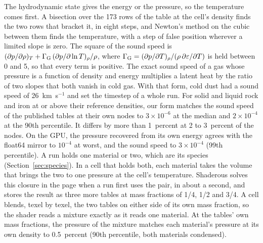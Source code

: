 \documentclass[twocolumn]{aastex701}
\begin{document}
The hydrodynamic state gives the energy or the pressure, so the temperature comes first. A bisection over the 173 rows of the table at the cell's density finds the two rows that bracket it, in eight steps, and Newton's method on the cubic between them finds the temperature, with a step of false position wherever a limited slope is zero. The square of the sound speed is $(\partial p/\partial\rho)_T + \Gamma_{\rm G}\,(\partial p/\partial\ln T)_\rho/\rho$, where $\Gamma_{\rm G} = (\partial p/\partial T)_\rho/(\rho\,\partial\varepsilon/\partial T)$ is held between 0 and 5, so that every term is positive. The exact sound speed of a gas whose pressure is a function of density and energy multiplies a latent heat by the ratio of two slopes that both vanish in cold gas. With that form, cold dust had a sound speed of 26~km~s$^{-1}$ and set the timestep of a whole run. For solid and liquid rock and iron at or above their reference densities, our form matches the sound speed of the published tables \citep{StewartFe85Si15_2020, StewartPyrolite2022} at their own nodes to $3\times10^{-6}$ at the median and $2\times10^{-4}$ at the 90th percentile. It differs by more than 1~percent at 2 to 3~percent of the nodes. On the GPU, the pressure recovered from its own energy agrees with the float64 mirror to $10^{-4}$ at worst, and the sound speed to $3\times10^{-4}$ (99th percentile). A run holds one material or two, which are its species (Section~\ref{sec:species}). In a cell that holds both, each material takes the volume that brings the two to one pressure at the cell's temperature. Shaderous solves this closure in the page when a run first uses the pair, in about a second, and stores the result as three more tables at mass fractions of 1/4, 1/2 and 3/4. A cell blends, texel by texel, the two tables on either side of its own mass fraction, so the shader reads a mixture exactly as it reads one material. At the tables' own mass fractions, the pressure of the mixture matches each material's pressure at its own density to 0.5~percent (90th percentile, both materials condensed).
\end{document}
